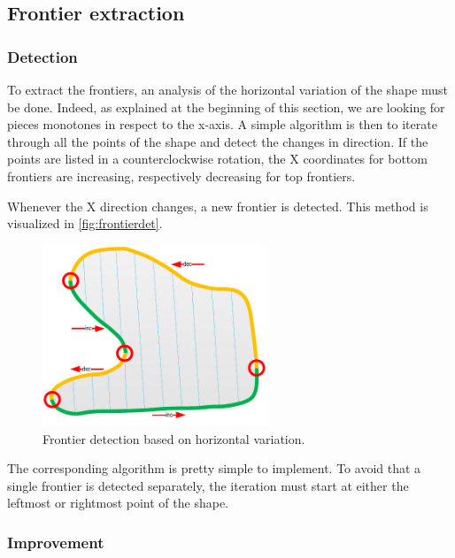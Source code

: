 \subsection{Frontier extraction}

\subsubsection{Detection}

To extract the frontiers, an analysis of the horizontal variation of the shape must be done. Indeed, as explained at the beginning of this section, we are looking for pieces monotones in respect to the x-axis. A simple algorithm is then to iterate through all the points of the shape and detect the changes in direction. If the points are listed in a counterclockwise rotation, the X coordinates for bottom frontiers are increasing, respectively decreasing for top frontiers.

Whenever the X direction changes, a new frontier is detected. This method is visualized in \autoref{fig:frontierdet}.

\begin{figure}[!ht]
\centering
\includegraphics[width=0.6\textwidth]{images/frontier-detect}
\caption{Frontier detection based on horizontal variation.}
\label{fig:frontierdet}
\end{figure}

The corresponding algorithm is pretty simple to implement. To avoid that a single frontier is detected separately, the iteration must start at either the leftmost or rightmost point of the shape.

\subsubsection{Improvement}

